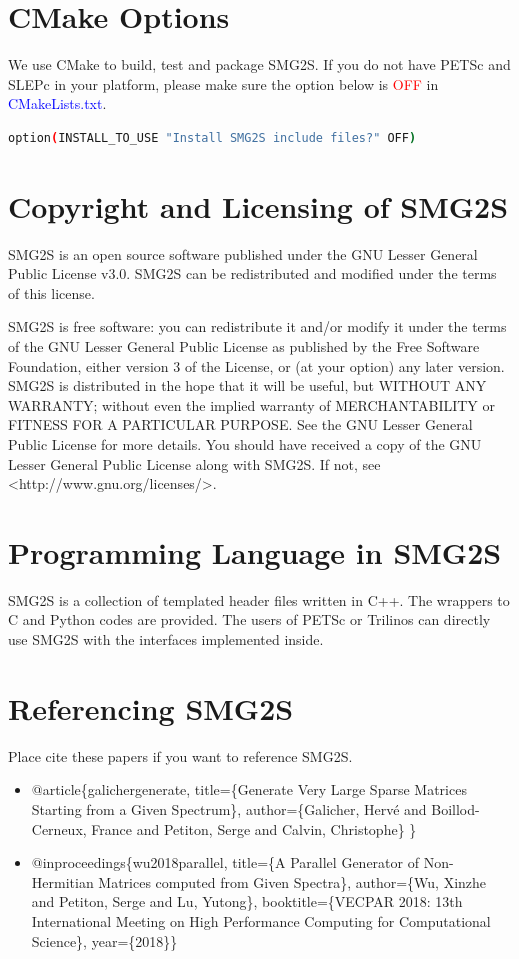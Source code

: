 \documentclass[a4paper, 10 pt]{report}
\begin{document}
	\section{CMake Options}
	We use CMake to build, test and package SMG2S. If you do not have PETSc and SLEPc in your platform, please make sure the option below is \textcolor{red}{OFF} in \textcolor{blue}{CMakeLists.txt}.
	
	\begin{lstlisting}[language=bash,frame=single]
option(INSTALL_TO_USE "Install SMG2S include files?" OFF)
	\end{lstlisting}
	
	\section{Copyright and Licensing of SMG2S}
	
	SMG2S is an open source software published under the GNU Lesser General Public License v3.0. SMG2S can be redistributed and modified under the terms of this license.
	
	SMG2S is free software: you can redistribute it and/or modify
	it under the terms of the GNU Lesser General Public License as published
	by the Free Software Foundation, either version 3 of the License, or
	(at your option) any later version.
	SMG2S is distributed in the hope that it will be useful,
	but WITHOUT ANY WARRANTY; without even the implied warranty of
	MERCHANTABILITY or FITNESS FOR A PARTICULAR PURPOSE.  See the
	GNU Lesser General Public License for more details.
	You should have received a copy of the GNU Lesser General Public License
	along with SMG2S.  If not, see <http://www.gnu.org/licenses/>.
	
	\section{Programming Language in SMG2S}
	SMG2S is a collection of templated header files written in C++. The wrappers to C and Python codes are provided. The users of PETSc or Trilinos can  directly use SMG2S with the interfaces implemented inside.
	
	\section{Referencing SMG2S}
	
	Place cite these papers if you want to reference SMG2S.
	
	\begin{itemize}
		\item @article\{galichergenerate, title=\{Generate Very Large Sparse Matrices Starting from a Given Spectrum\},  author=\{Galicher, Herv{\'e} and Boillod-Cerneux, France and Petiton, Serge and Calvin, Christophe\}
		\}

		\item @inproceedings\{wu2018parallel,
			title=\{A Parallel Generator of Non-Hermitian Matrices computed from Given Spectra\},
			author=\{Wu, Xinzhe and Petiton, Serge and Lu, Yutong\},
			booktitle=\{VECPAR 2018: 13th International Meeting on High Performance Computing for Computational Science\},
			year=\{2018\}\}		
	\end{itemize}
\end{document}

